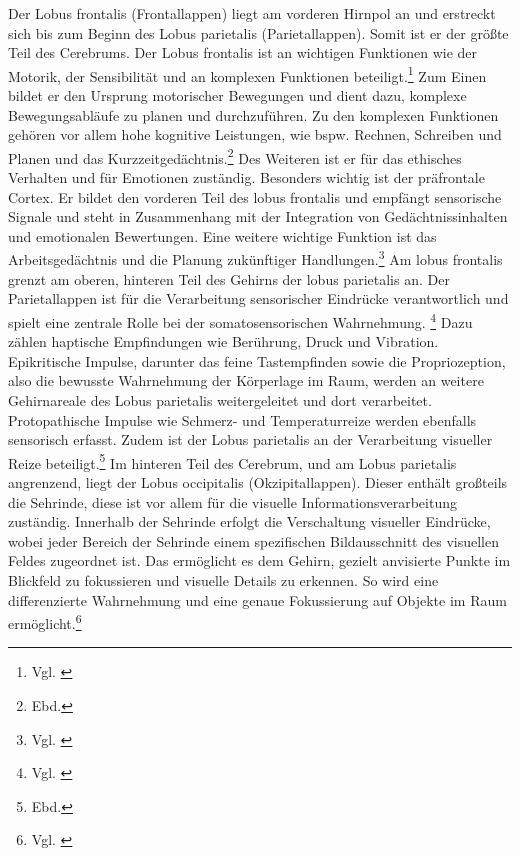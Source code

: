 Der Lobus frontalis (Frontallappen) liegt am vorderen Hirnpol an und erstreckt sich bis zum Beginn des Lobus parietalis (Parietallappen). Somit ist er der größte Teil des Cerebrums. Der Lobus frontalis ist an wichtigen Funktionen wie der Motorik, der Sensibilität und an komplexen Funktionen beteiligt.\footnote{Vgl. \cite{doccheck_frontallappen}} Zum Einen bildet er den Ursprung motorischer Bewegungen und dient dazu, komplexe Bewegungsabläufe zu planen und durchzuführen. Zu den komplexen Funktionen gehören vor allem hohe kognitive Leistungen, wie bspw. Rechnen, Schreiben und Planen und das Kurzzeitgedächtnis.\footnote{Ebd.} Des Weiteren ist er für das ethisches Verhalten und für Emotionen zuständig. \newline
Besonders wichtig ist der präfrontale Cortex. Er bildet den vorderen Teil des lobus frontalis und empfängt sensorische Signale und steht in Zusammenhang mit der Integration von Gedächtnissinhalten und emotionalen Bewertungen. Eine weitere wichtige Funktion ist das Arbeitsgedächtnis und die Planung zukünftiger Handlungen.\footnote{Vgl. \cite{medi_frontallappen}} \newline
Am lobus frontalis grenzt am oberen, hinteren Teil des Gehirns der lobus parietalis an. Der Parietallappen ist für die Verarbeitung sensorischer Eindrücke verantwortlich und spielt eine zentrale Rolle bei der somatosensorischen Wahrnehmung. \footnote{Vgl. \cite{medi_parietallappen}} Dazu zählen haptische Empfindungen wie Berührung, Druck und Vibration. Epikritische Impulse, darunter das feine Tastempfinden sowie die Propriozeption, also die bewusste Wahrnehmung der Körperlage im Raum, werden an weitere Gehirnareale des Lobus parietalis weitergeleitet und dort verarbeitet. Protopathische Impulse wie Schmerz- und Temperaturreize werden ebenfalls sensorisch erfasst. Zudem ist der Lobus parietalis an der Verarbeitung visueller Reize beteiligt.\footnote{Ebd.} \newline
Im hinteren Teil des Cerebrum, und am Lobus parietalis angrenzend, liegt der Lobus occipitalis (Okzipitallappen). Dieser enthält  großteils die Sehrinde, diese ist vor allem für die visuelle Informationsverarbeitung zuständig. Innerhalb der Sehrinde erfolgt die Verschaltung visueller Eindrücke, wobei jeder Bereich der Sehrinde einem spezifischen Bildausschnitt des visuellen Feldes zugeordnet ist. Das ermöglicht es dem Gehirn, gezielt anvisierte Punkte im Blickfeld zu fokussieren und visuelle Details zu erkennen. So wird eine differenzierte Wahrnehmung und eine genaue Fokussierung auf Objekte im Raum ermöglicht.\footnote{Vgl. \cite{medi_okzipitallappen}} \newline
